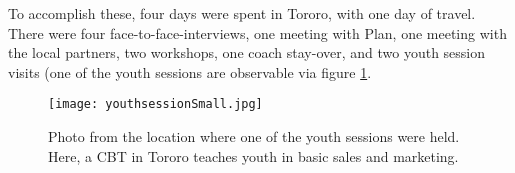 To accomplish these, four days were spent in Tororo, with one day of travel. There were four face-to-face-interviews,
one meeting with Plan, one meeting with the local partners, two workshops, one coach stay-over, and two youth session visits (one of the youth sessions are observable via figure \ref{fig:youthsession}.

\begin{figure}[h]
    \centering
    \texttt{[image: youthsessionSmall.jpg]}
    \caption{Photo from the location where one of the youth sessions were held. Here, a CBT in Tororo teaches youth in basic sales and marketing.}
    \label{fig:youthsession}
\end{figure}
